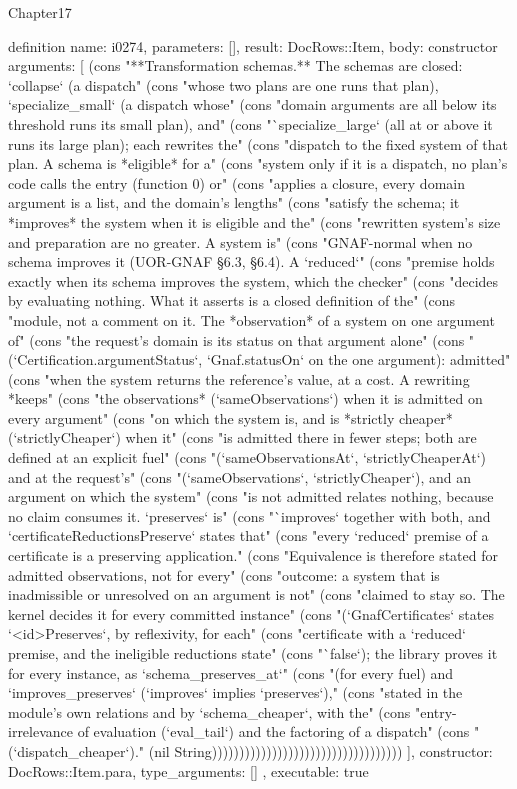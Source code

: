 \begin{lexlean}{Chapter17}
\begin{semanticmodule}
definition{
  name: i0274,
  parameters: [],
  result: DocRows::Item,
  body: constructor{
    arguments: [
      (cons "**Transformation schemas.** The schemas are closed: `collapse` (a dispatch" (cons "whose two plans are one runs that plan), `specialize_small` (a dispatch whose" (cons "domain arguments are all below its threshold runs its small plan), and" (cons "`specialize_large` (all at or above it runs its large plan); each rewrites the" (cons "dispatch to the fixed system of that plan. A schema is *eligible* for a" (cons "system only if it is a dispatch, no plan's code calls the entry (function 0) or" (cons "applies a closure, every domain argument is a list, and the domain's lengths" (cons "satisfy the schema; it *improves* the system when it is eligible and the" (cons "rewritten system's size and preparation are no greater. A system is" (cons "GNAF-normal when no schema improves it (UOR-GNAF §6.3, §6.4). A `reduced`" (cons "premise holds exactly when its schema improves the system, which the checker" (cons "decides by evaluating nothing. What it asserts is a closed definition of the" (cons "module, not a comment on it. The *observation* of a system on one argument of" (cons "the request's domain is its status on that argument alone" (cons "(`Certification.argumentStatus`, `Gnaf.statusOn` on the one argument): admitted" (cons "when the system returns the reference's value, at a cost. A rewriting *keeps" (cons "the observations* (`sameObservations`) when it is admitted on every argument" (cons "on which the system is, and is *strictly cheaper* (`strictlyCheaper`) when it" (cons "is admitted there in fewer steps; both are defined at an explicit fuel" (cons "(`sameObservationsAt`, `strictlyCheaperAt`) and at the request's" (cons "(`sameObservations`, `strictlyCheaper`), and an argument on which the system" (cons "is not admitted relates nothing, because no claim consumes it. `preserves` is" (cons "`improves` together with both, and `certificateReductionsPreserve` states that" (cons "every `reduced` premise of a certificate is a preserving application." (cons "Equivalence is therefore stated for admitted observations, not for every" (cons "outcome: a system that is inadmissible or unresolved on an argument is not" (cons "claimed to stay so. The kernel decides it for every committed instance" (cons "(`GnafCertificates` states `<id>Preserves`, by reflexivity, for each" (cons "certificate with a `reduced` premise, and the ineligible reductions state" (cons "`false`); the library proves it for every instance, as `schema_preserves_at`" (cons "(for every fuel) and `improves_preserves` (`improves` implies `preserves`)," (cons "stated in the module's own relations and by `schema_cheaper`, with the" (cons "entry-irrelevance of evaluation (`eval_tail`) and the factoring of a dispatch" (cons "(`dispatch_cheaper`)." (nil String)))))))))))))))))))))))))))))))))))
    ],
    constructor: DocRows::Item.para,
    type_arguments: []
  },
  executable: true
}


\end{semanticmodule}
\end{lexlean}
